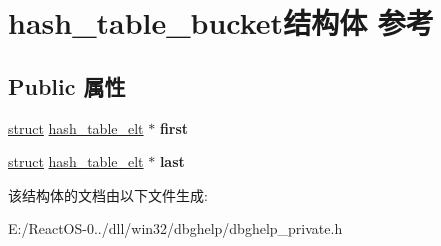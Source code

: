 \hypertarget{structhash__table__bucket}{}\section{hash\+\_\+table\+\_\+bucket结构体 参考}
\label{structhash__table__bucket}
\subsection*{Public 属性}
\begin{DoxyCompactItemize}
\item 
\mbox{\label{structhash__table__bucket_a08854c7a34b0fd33d86f573017bbbce4}} 
\hyperlink{interfacestruct}{struct} \hyperlink{structhash__table__elt}{hash\+\_\+table\+\_\+elt} $\ast$ {\bfseries first}
\item 
\mbox{\label{structhash__table__bucket_aa81a52dc23ec3672952d4caf61477294}} 
\hyperlink{interfacestruct}{struct} \hyperlink{structhash__table__elt}{hash\+\_\+table\+\_\+elt} $\ast$ {\bfseries last}
\end{DoxyCompactItemize}


该结构体的文档由以下文件生成\+:\begin{DoxyCompactItemize}
\item 
E\+:/\+React\+O\+S-\/0../dll/win32/dbghelp/dbghelp\+\_\+private.\+h\end{DoxyCompactItemize}
